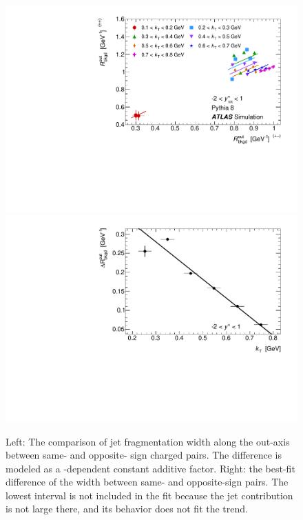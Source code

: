 \begin{figure}[t]
\begin{minipage}[t]{1.0\textwidth}
\centering
\includegraphics[width=.55\linewidth]{can_kt_qosl_backRout.pdf}
\includegraphics[width=.44\linewidth]{can_kt_qosl_backRout_intercept.pdf}
\end{minipage}
\caption{
  Left: The comparison of jet fragmentation width along the out-axis between same- and opposite- sign charged pairs. The difference is modeled as a \kt-dependent constant additive factor. Right: the best-fit difference of the width between same- and opposite-sign pairs. The lowest \kt interval is not included in the fit because the jet contribution is not large there, and its behavior does not fit the trend.
}
\label{fig:background_qosl_Rout_same_vs_opp_pythia8}
\end{figure}

